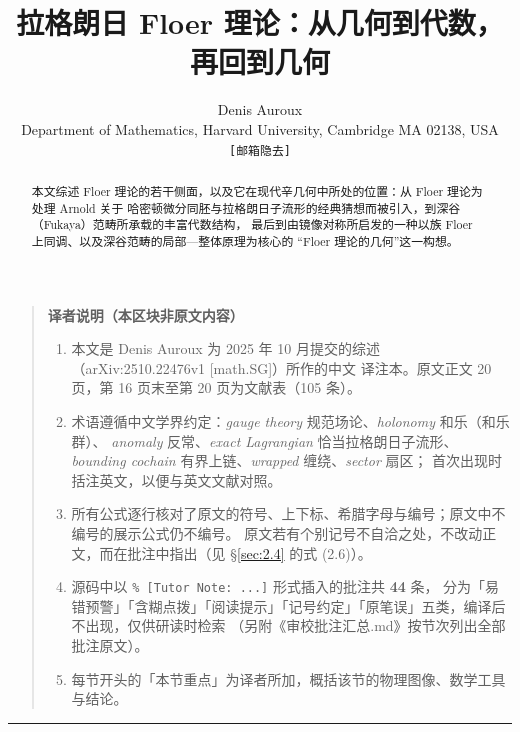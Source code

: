 \documentclass[UTF8,a4paper,11pt,fontset=windows]{ctexart}
\title{\bfseries 拉格朗日 Floer 理论：从几何到代数，再回到几何}
\author{Denis Auroux\\[2pt]
  \small Department of Mathematics, Harvard University, Cambridge MA 02138, USA\\
  \small \texttt{[邮箱隐去]}}
\date{}
\theoremstyle{cnthm}
\numberwithin{equation}{section}
\begin{document}
\maketitle

\begin{quote}\small
\noindent\textbf{译者说明（本区块非原文内容）}

\begin{enumerate}[leftmargin=1.6em,itemsep=1pt,topsep=2pt]
  \item 本文是 Denis Auroux 为 2025 年 10 月提交的综述（arXiv:2510.22476v1 [math.SG]）所作的中文
        译注本。原文正文 20 页，第 16 页末至第 20 页为文献表（105 条）。
  \item 术语遵循中文学界约定：\textit{gauge theory} 规范场论、\textit{holonomy} 和乐（和乐群）、
        \textit{anomaly} 反常、\textit{exact Lagrangian} 恰当拉格朗日子流形、
        \textit{bounding cochain} 有界上链、\textit{wrapped} 缠绕、\textit{sector} 扇区；
        首次出现时括注英文，以便与英文文献对照。
  \item 所有公式逐行核对了原文的符号、上下标、希腊字母与编号；原文中不编号的展示公式仍不编号。
        原文若有个别记号不自洽之处，不改动正文，而在批注中指出（见 \S\ref{sec:2.4} 的式 (2.6)）。
  \item 源码中以 \verb|% [Tutor Note: ...]| 形式插入的批注共 \textbf{44} 条，
        分为「易错预警」「含糊点拨」「阅读提示」「记号约定」「原笔误」五类，编译后不出现，仅供研读时检索
        （另附《审校批注汇总.md》按节次列出全部批注原文）。
  \item 每节开头的「本节重点」为译者所加，概括该节的物理图像、数学工具与结论。
\end{enumerate}
\end{quote}

\vspace{6pt}
\noindent\rule{\linewidth}{0.5pt}
\vspace{4pt}

\begin{abstract}
本文综述 Floer 理论的若干侧面，以及它在现代辛几何中所处的位置：从 Floer 理论为处理 Arnold 关于
哈密顿微分同胚与拉格朗日子流形的经典猜想而被引入，到深谷（Fukaya）范畴所承载的丰富代数结构，
最后到由镜像对称所启发的一种以族 Floer 上同调、以及深谷范畴的局部—整体原理为核心的
“Floer 理论的几何”这一构想。
\end{abstract}
\end{document}
